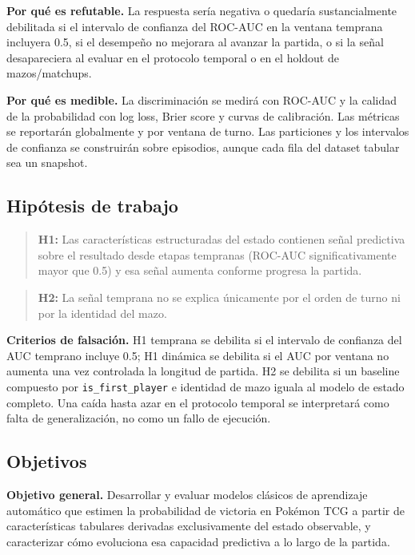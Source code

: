 \noindent\textbf{Por qué es refutable.} La respuesta sería negativa o
quedaría sustancialmente debilitada si el intervalo de confianza del
ROC-AUC en la ventana temprana incluyera 0.5, si el desempeño no
mejorara al avanzar la partida, o si la señal desapareciera al evaluar
en el protocolo temporal o en el holdout de mazos/matchups.

\noindent\textbf{Por qué es medible.} La discriminación se medirá con
ROC-AUC y la calidad de la probabilidad con log loss, Brier score y
curvas de calibración. Las métricas se reportarán globalmente y por
ventana de turno. Las particiones y los intervalos de confianza se
construirán sobre episodios, aunque cada fila del dataset tabular sea un
snapshot.

\subsection{Hipótesis de trabajo}
\label{subsec:hipotesis}
\begin{quote}
\textbf{H1:} Las características estructuradas del estado contienen
señal predictiva sobre el resultado desde etapas tempranas
(ROC-AUC significativamente mayor que 0.5) y esa señal aumenta conforme
progresa la partida.
\end{quote}
\begin{quote}
\textbf{H2:} La señal temprana no se explica únicamente por el orden de
turno ni por la identidad del mazo.
\end{quote}

\noindent\textbf{Criterios de falsación.} H1 temprana se debilita si el
intervalo de confianza del AUC temprano incluye 0.5; H1 dinámica se
debilita si el AUC por ventana no aumenta una vez controlada la
longitud de partida. H2 se debilita si un baseline compuesto por
\texttt{is\_first\_player} e identidad de mazo iguala al modelo de estado
completo. Una caída hasta azar en el protocolo temporal se interpretará
como falta de generalización, no como un fallo de ejecución.

\subsection{Objetivos}
\label{subsec:objetivos}
\textbf{Objetivo general.} Desarrollar y evaluar modelos clásicos de
aprendizaje automático que estimen la probabilidad de victoria en
Pokémon TCG a partir de características tabulares derivadas
exclusivamente del estado observable, y caracterizar cómo evoluciona
esa capacidad predictiva a lo largo de la partida.

